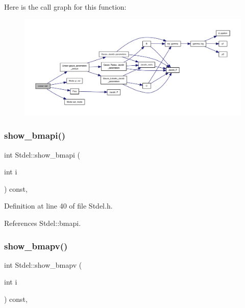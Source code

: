 Here is the call graph for this function\+:
\nopagebreak
\begin{figure}[H]
\begin{center}
\leavevmode
\includegraphics[width=350pt]{classLinear_a5cd90cf088a548e3440c905c063d9d6f_cgraph}
\end{center}
\end{figure}
\mbox{\label{classStdel_ad3a0646ad7ec2567e46da36285dee331}} 
\subsubsection{\texorpdfstring{show\+\_\+bmapi()}{show\_bmapi()}}
{\footnotesize\ttfamily int Stdel\+::show\+\_\+bmapi (\begin{DoxyParamCaption}\item[{int}]{i }\end{DoxyParamCaption}) const\hspace{0.3cm}{\ttfamily [inline]}, {\ttfamily [inherited]}}



Definition at line 40 of file Stdel.\+h.



References Stdel\+::bmapi.

\mbox{\label{classStdel_ac8787dabfb1d767b89e39806522c1161}} 
\subsubsection{\texorpdfstring{show\+\_\+bmapv()}{show\_bmapv()}}
{\footnotesize\ttfamily int Stdel\+::show\+\_\+bmapv (\begin{DoxyParamCaption}\item[{int}]{i }\end{DoxyParamCaption}) const\hspace{0.3cm}{\ttfamily [inline]}, {\ttfamily [inherited]}}



